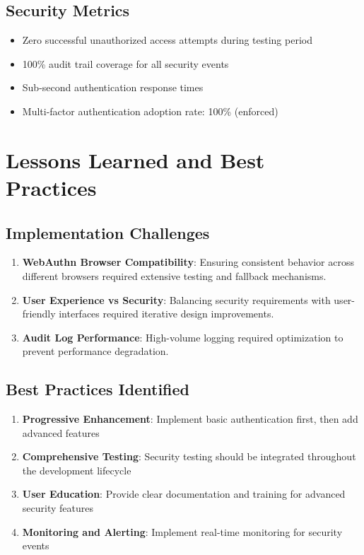 \documentclass[12pt,a4paper]{article}
\begin{document}
\subsection{Security Metrics}
\begin{itemize}
    \item Zero successful unauthorized access attempts during testing period
    \item 100\% audit trail coverage for all security events
    \item Sub-second authentication response times
    \item Multi-factor authentication adoption rate: 100\% (enforced)
\end{itemize}

\section{Lessons Learned and Best Practices}

\subsection{Implementation Challenges}
\begin{enumerate}
    \item \textbf{WebAuthn Browser Compatibility}: Ensuring consistent behavior across different browsers required extensive testing and fallback mechanisms.
    \item \textbf{User Experience vs Security}: Balancing security requirements with user-friendly interfaces required iterative design improvements.
    \item \textbf{Audit Log Performance}: High-volume logging required optimization to prevent performance degradation.
\end{enumerate}

\subsection{Best Practices Identified}
\begin{enumerate}
    \item \textbf{Progressive Enhancement}: Implement basic authentication first, then add advanced features
    \item \textbf{Comprehensive Testing}: Security testing should be integrated throughout the development lifecycle
    \item \textbf{User Education}: Provide clear documentation and training for advanced security features
    \item \textbf{Monitoring and Alerting}: Implement real-time monitoring for security events
\end{enumerate}
\end{document}
